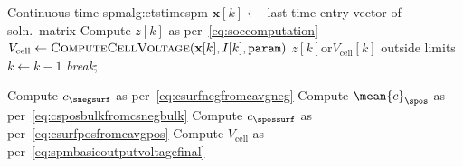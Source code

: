 {\begin{customalgo}[1.0\textwidth]{Continuous time \gls{spm}}{alg:ctstimespm}
        \State $\mathbf{x}[k] \gets $ last time-entry  vector of
        soln.\  matrix
        \State Compute $z[k]$ as per~\cref{eq:soccomputation}
        \State $V_\text{cell} \gets \textsc{ComputeCellVoltage}(\textbf{x}[k],I[k],\texttt{param}) $
        \If $z[k] \text{or} V_\text{cell}[k]$ outside limits 
            \State $k \gets k - 1$ 
            \State \textit{break};
            \EndIf
        \EndFor
        \EndProcedure

        \State Compute $c_\snegsurf$ as per~\cref{eq:csurfnegfromcavgneg}
        \State Compute $\mean{c}_\spos$ as per~\cref{eq:csposbulkfromcsnegbulk}
        \State Compute $c_\spossurf$ as per~\cref{eq:csurfposfromcavgpos}
        \State Compute $V_\text{cell}$ as per~\cref{eq:spmbasicoutputvoltagefinal}
        \EndOutputEqn%
    \end{customalgo}
}%
